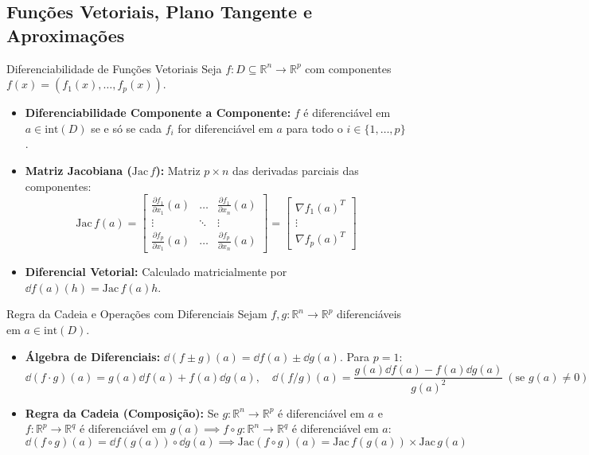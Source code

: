 \documentclass[11pt,a4paper]{article}
\newcommand{\R}{\mathbb{R}}
\begin{document}
\subsection{Funções Vetoriais, Plano Tangente e Aproximações}

\noindent\begin{definitionbox}{Diferenciabilidade de Funções Vetoriais}
  Seja $f : D \subseteq \R^n \to \R^p$ com componentes $f(x) = (f_1(x), \dots, f_p(x))$.
  \begin{itemize}
    \item \textbf{Diferenciabilidade Componente a Componente:} $f$ é diferenciável em $a \in \text{int}(D)$ se e só se cada $f_i$ for diferenciável em $a$ para todo o $i \in \{1,\dots,p\}$.
    \item \textbf{Matriz Jacobiana ($\text{Jac}\,f$):} Matriz $p \times n$ das derivadas parciais das componentes:
      \[ \text{Jac}\,f(a) = \begin{bmatrix} \frac{\partial f_1}{\partial x_1}(a) & \dots & \frac{\partial f_1}{\partial x_n}(a) \\ \vdots & \ddots & \vdots \\ \frac{\partial f_p}{\partial x_1}(a) & \dots & \frac{\partial f_p}{\partial x_n}(a) \end{bmatrix} = \begin{bmatrix} \nabla f_1(a)^T \\ \vdots \\ \nabla f_p(a)^T \end{bmatrix} \]
    \item \textbf{Diferencial Vetorial:} Calculado matricialmente por $\dd f(a)(h) = \text{Jac}\,f(a)h$.
  \end{itemize}
\end{definitionbox}

\noindent\begin{theorembox}{Regra da Cadeia e Operações com Diferenciais}
  Sejam $f, g : \R^n \to \R^p$ diferenciáveis em $a \in \text{int}(D)$.
  \begin{itemize}
    \item \textbf{Álgebra de Diferenciais:} $\dd(f \pm g)(a) = \dd f(a) \pm \dd g(a)$. Para $p=1$:
      \[ \dd(f \cdot g)(a) = g(a)\dd f(a) + f(a)\dd g(a), \quad \dd(f/g)(a) = \frac{g(a)\dd f(a) - f(a)\dd g(a)}{g(a)^2} \ (\text{se } g(a)\neq 0) \]
    \item \textbf{Regra da Cadeia (Composição):} Se $g : \R^n \to \R^p$ é diferenciável em $a$ e $f : \R^p \to \R^q$ é diferenciável em $g(a) \implies f \circ g : \R^n \to \R^q$ é diferenciável em $a$:
      \[ \dd(f \circ g)(a) = \dd f(g(a)) \circ \dd g(a) \implies \text{Jac}(f \circ g)(a) = \text{Jac}\,f(g(a)) \times \text{Jac}\,g(a) \]
  \end{itemize}
\end{theorembox}
\end{document}
